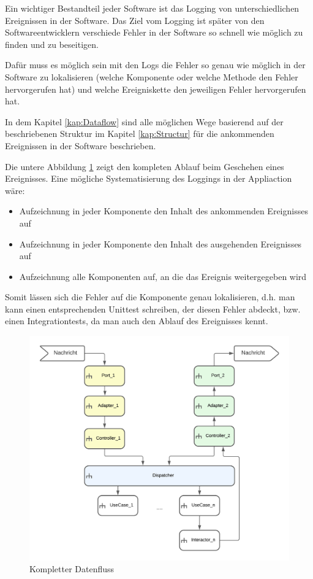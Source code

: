 Ein wichtiger Bestandteil jeder Software ist das Logging von unterschiedlichen Ereignissen in der Software.
Das Ziel vom Logging ist später von den Softwareentwicklern verschiede Fehler in der Software so schnell wie möglich zu finden und
zu beseitigen.

Dafür muss es möglich sein mit den Logs die Fehler so genau wie möglich in der Software zu lokalisieren 
(welche Komponente oder welche Methode den Fehler hervorgerufen hat) 
und welche Ereigniskette den jeweiligen Fehler hervorgerufen hat.

In dem Kapitel \ref{kap:Dataflow} sind alle möglichen Wege basierend auf der beschriebenen Struktur 
im Kapitel \ref{kap:Structur} für die ankommenden Ereignissen in der Software beschrieben.

Die untere Abbildung \ref{fig:FullDataFlow} zeigt den kompleten Ablauf beim Geschehen eines Ereignisses.
Eine mögliche Systematisierung des Loggings in der Appliaction wäre: 
\begin{itemize}
    \item Aufzeichnung in jeder Komponente den Inhalt des ankommenden Ereignisses auf
    \item Aufzeichnung in jeder Komponente den Inhalt des ausgehenden Ereignisses auf
    \item Aufzeichnung alle Komponenten auf, an die das Ereignis weitergegeben wird
\end{itemize}

Somit lässen sich die Fehler auf die Komponente genau lokalisieren, d.h. man kann einen entsprechenden Unittest schreiben, 
der diesen Fehler abdeckt, bzw. einen Integrationtests, da man auch den Ablauf des Ereignisses kennt.

\begin{figure}[H]
    \centering
    \includegraphics[width=12cm]{./images/FullDataFlow.png}
     \caption[Kompletter Datenfluss]{Kompletter Datenfluss \footnotemark}
     \label{fig:FullDataFlow}
\end{figure}
